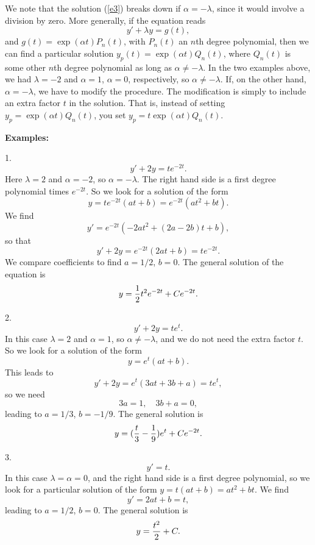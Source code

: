 We note that the solution (\ref{e3}) breaks down if $\alpha=-\lambda$, since
it would involve a division by zero. More generally, if the equation reads
$$y'+\lambda y=g(t),$$
and $g(t)=\exp(\alpha t)P_n(t)$, with $P_n(t)$ an $n$th degree polynomial,
then we can find a particular solution $y_p(t)=\exp(\alpha t)Q_n(t)$, where
$Q_n(t)$ is some other $n$th degree polynomial as long as $\alpha\neq -\lambda$.
In the two examples above, we had $\lambda=-2$ and $\alpha=1$, $\alpha=0$,
respectively, so $\alpha\neq -\lambda$. If, on the other hand,
$\alpha=-\lambda$, we have to modify the procedure. The modification is
simply to include an extra factor $t$ in the solution. That is, instead of
setting $y_p=\exp(\alpha t)Q_n(t)$, you set $y_p=t\exp(\alpha t)Q_n(t)$.

{\bf Examples:}

1.
$$y'+2y=te^{-2t}.$$
Here $\lambda=2$ and $\alpha=-2$, so $\alpha=-\lambda$. The right hand side
is a first degree polynomial times $e^{-2t}$. So we look for a solution of
the form
$$y=te^{-2t}(at+b)=e^{-2t}(at^2+bt).$$
We find
$$y'=e^{-2t}(-2at^2+(2a-2b)t+b),$$
so that
$$y'+2y=e^{-2t}(2at+b)=te^{-2t}.$$
We compare coefficients to find $a=1/2$, $b=0$.
The general solution of the equation is
$$y={1\over 2}t^2e^{-2t}+Ce^{-2t}.$$

2.
$$y'+2y=te^t.$$
In this case $\lambda=2$ and $\alpha=1$, so $\alpha\neq -\lambda$, and we
do not need the extra factor $t$. So we look for a solution of the form
$$y=e^t(at+b).$$
This leads to
$$y'+2y=e^t(3at+3b+a)=te^t,$$
so we need
$$3a=1,\quad 3b+a=0,$$
leading to $a=1/3$, $b=-1/9$.
The general solution is
$$y=({t\over 3}-{1\over 9})e^t+Ce^{-2t}.$$

3.
$$y'=t.$$
In this case $\lambda=\alpha=0$, and the right hand side is a first degree
polynomial, so we look for a particular solution of the form $y=t(at+b)=at^2
+bt$. We find
$$y'=2at+b=t,$$
leading to $a=1/2$, $b=0$. The general solution is
$$y={t^2\over 2}+C.$$

